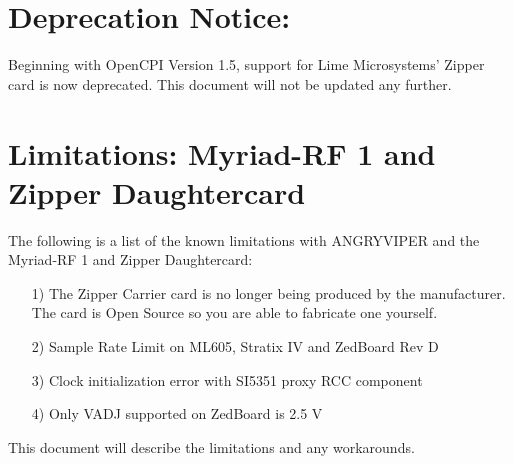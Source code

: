 \iffalse
This file is protected by Copyright. Please refer to the COPYRIGHT file
distributed with this source distribution.

This file is part of OpenCPI <http://www.opencpi.org>

OpenCPI is free software: you can redistribute it and/or modify it under the
terms of the GNU Lesser General Public License as published by the Free Software
Foundation, either version 3 of the License, or (at your option) any later
version.

OpenCPI is distributed in the hope that it will be useful, but WITHOUT ANY
WARRANTY; without even the implied warranty of MERCHANTABILITY or FITNESS FOR A
PARTICULAR PURPOSE. See the GNU Lesser General Public License for more details.

You should have received a copy of the GNU Lesser General Public License along
with this program. If not, see <http://www.gnu.org/licenses/>.
\fi
\def\snippetpath{../../../../../../doc/av/tex/snippets}


\usepackage{graphicx}
\graphicspath{ {figures/} }
\usepackage{fancyhdr}
\usepackage{colortbl}
\usepackage[justification=centering]{caption}
\pagestyle{fancy}
\renewcommand{\headrulewidth}{0pt}

\section*{Deprecation Notice:}
Beginning with OpenCPI Version 1.5, support for Lime Microsystems' Zipper card is now deprecated. This document will not be updated any further.
\section*{Limitations: Myriad-RF 1 and Zipper Daughtercard}
The following is a list of the known limitations with ANGRYVIPER and the Myriad-RF 1 and Zipper Daughtercard:\par
	\begin{itemize}
	\item[1)] The Zipper Carrier card is no longer being produced by the manufacturer. The card is Open Source so you are able to fabricate one yourself.
	\item[2)] Sample Rate Limit on ML605, Stratix IV and ZedBoard Rev D
	\item[3)] Clock initialization error with SI5351 proxy RCC component
	\item[4)] Only VADJ supported on ZedBoard is 2.5 V
	\end{itemize}
This document will describe the limitations and any workarounds.
